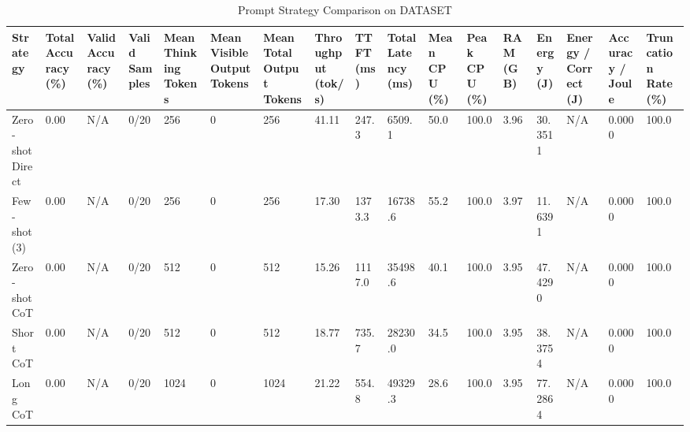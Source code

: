 \begin{table}
\caption{Prompt Strategy Comparison on DATASET}
\label{tab:strategy_comparison}
\begin{tabular}{lllllllllllllllll}
\toprule
Strategy & Total Accuracy (\%) & Valid Accuracy (\%) & Valid Samples & Mean Thinking Tokens & Mean Visible Output Tokens & Mean Total Output Tokens & Throughput (tok/s) & TTFT (ms) & Total Latency (ms) & Mean CPU (\%) & Peak CPU (\%) & RAM (GB) & Energy (J) & Energy / Correct (J) & Accuracy / Joule & Truncation Rate (\%) \\
\midrule
Zero-shot Direct & 0.00 & N/A & 0/20 & 256 & 0 & 256 & 41.11 & 247.3 & 6509.1 & 50.0 & 100.0 & 3.96 & 30.3511 & N/A & 0.0000 & 100.0 \\
Few-shot (3) & 0.00 & N/A & 0/20 & 256 & 0 & 256 & 17.30 & 1373.3 & 16738.6 & 55.2 & 100.0 & 3.97 & 11.6391 & N/A & 0.0000 & 100.0 \\
Zero-shot CoT & 0.00 & N/A & 0/20 & 512 & 0 & 512 & 15.26 & 1117.0 & 35498.6 & 40.1 & 100.0 & 3.95 & 47.4290 & N/A & 0.0000 & 100.0 \\
Short CoT & 0.00 & N/A & 0/20 & 512 & 0 & 512 & 18.77 & 735.7 & 28230.0 & 34.5 & 100.0 & 3.95 & 38.3754 & N/A & 0.0000 & 100.0 \\
Long CoT & 0.00 & N/A & 0/20 & 1024 & 0 & 1024 & 21.22 & 554.8 & 49329.3 & 28.6 & 100.0 & 3.95 & 77.2864 & N/A & 0.0000 & 100.0 \\
\bottomrule
\end{tabular}
\end{table}

